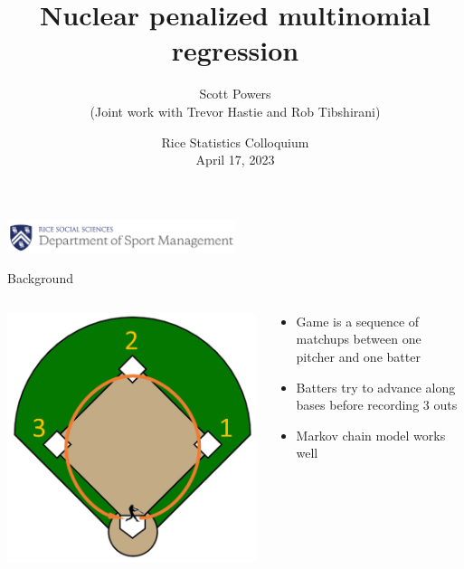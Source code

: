 \documentclass[handout]{beamer}
\title{Nuclear penalized multinomial regression}
\author{\color{ricerichblue} Scott Powers \\ \color{ricegray} \scriptsize (Joint work with Trevor Hastie and Rob Tibshirani)}
\date{Rice Statistics Colloquium \\ April 17, 2023}
\begin{document}
\begin{frame}
  \maketitle
  \vfill
  \hfill
  \includegraphics[width = 0.5\textwidth]{images/rice_smgt.png}
\end{frame}

\begin{frame}{Background}
  \begin{columns}
    \begin{column}{0.4\textwidth}
      \includegraphics[width = \textwidth]{images/bases.png}
    \end{column}
    \begin{column}{0.6\textwidth}
      \begin{itemize}
        \item Game is a sequence of matchups between one pitcher and one batter
        \item Batters try to advance along bases before recording 3 outs
        \item Markov chain model works well
        \begin{itemize}

\end{itemize}
\end{itemize}
\end{column}
\end{columns}
\end{frame}
\end{document}
